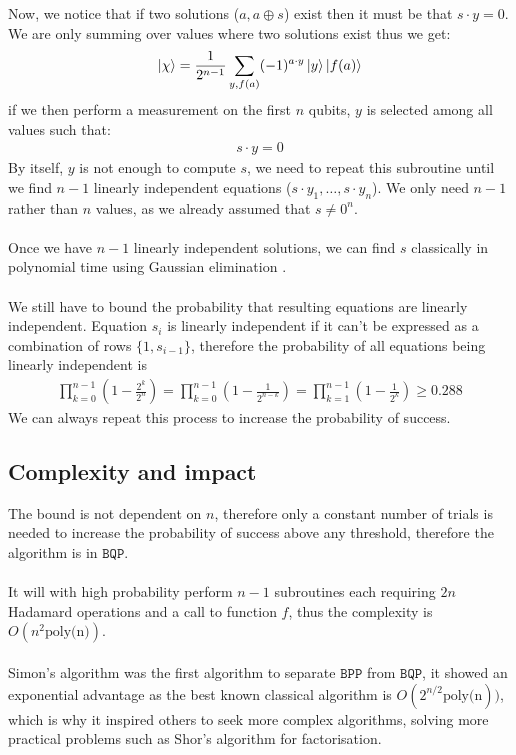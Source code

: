 Now, we notice that if two solutions ($a, a\oplus s$) exist then it must be that $s \cdot y=0$. We are only summing over values where two solutions exist thus we get:
\begin{align*}
    \ket{\chi}=\frac{1}{2^{n-1}}\sum_{y,f(a)}(-1)^{a\cdot y}\ket{y}\ket{f(a)}
\end{align*}
if we then perform a measurement on the first $n$ qubits, $y$ is selected among all values such that:
\begin{align*}
    s\cdot y = 0
\end{align*}
By itself, $y$ is not enough to compute $s$, we need to repeat this subroutine until we find $n-1$ linearly independent equations ($s\cdot y_1,\dots ,s\cdot y_n$). We only need $n-1$ rather than $n$ values, as we already assumed that $s\neq 0^n$.\\\\
Once we have $n-1$ linearly independent solutions, we can find $s$ classically in polynomial time using Gaussian elimination \cite{cormen2009}.\\\\
We still have to bound the probability that resulting equations are linearly independent. Equation $s_i$ is linearly independent if it can't be expressed as a combination of rows $\{1,s_{i-1}\}$, therefore the probability of all equations being linearly independent is  
\begin{align*}
    \prod_{k=0}^{n-1} \left(1-\frac{2^k}{2^n}\right)=\prod_{k=0}^{n-1} \left(1-\frac{1}{2^{n-k}}\right)=\prod_{k=1}^{n-1} \left(1-\frac{1}{2^{k}}\right) \geq 0.288
\end{align*}
We can always repeat this process to increase the probability of success.\subsection{Complexity and impact}
The bound is not dependent on $n$, therefore only a constant number of trials is needed to increase the probability of success above any threshold, therefore the algorithm is in $\mathtt{BQP}$.\\\\
It will with high probability perform $n-1$ subroutines each requiring $2n$ Hadamard operations and a call to function $f$, thus the complexity is $O(n^2 \text{poly(n)})$.\\\\
Simon's algorithm was the first algorithm to separate $\mathtt{BPP}$  from $\mathtt{BQP}$, it showed an exponential advantage as the best known classical algorithm is $O(2^{n/2}\text{poly(n}))$, which is why it inspired others to seek more complex algorithms, solving more practical problems such as Shor's algorithm for factorisation.
